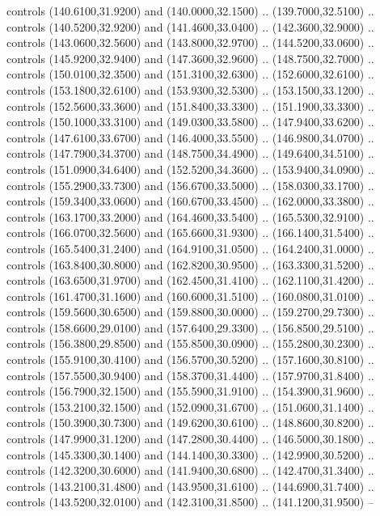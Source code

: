 {\begin{scope}[y=0.80pt, x=0.80pt, yscale=-1, xscale=1, inner sep=0pt, outer sep=0pt, #1]
      controls (140.6100,31.9200) and (140.0000,32.1500) .. (139.7000,32.5100) ..
      controls (140.5200,32.9200) and (141.4600,33.0400) .. (142.3600,32.9000) ..
      controls (143.0600,32.5600) and (143.8000,32.9700) .. (144.5200,33.0600) ..
      controls (145.9200,32.9400) and (147.3600,32.9600) .. (148.7500,32.7000) ..
      controls (150.0100,32.3500) and (151.3100,32.6300) .. (152.6000,32.6100) ..
      controls (153.1800,32.6100) and (153.9300,32.5300) .. (153.1500,33.1200) ..
      controls (152.5600,33.3600) and (151.8400,33.3300) .. (151.1900,33.3300) ..
      controls (150.1000,33.3100) and (149.0300,33.5800) .. (147.9400,33.6200) ..
      controls (147.6100,33.6700) and (146.4000,33.5500) .. (146.9800,34.0700) ..
      controls (147.7900,34.3700) and (148.7500,34.4900) .. (149.6400,34.5100) ..
      controls (151.0900,34.6400) and (152.5200,34.3600) .. (153.9400,34.0900) ..
      controls (155.2900,33.7300) and (156.6700,33.5000) .. (158.0300,33.1700) ..
      controls (159.3400,33.0600) and (160.6700,33.4500) .. (162.0000,33.3800) ..
      controls (163.1700,33.2000) and (164.4600,33.5400) .. (165.5300,32.9100) ..
      controls (166.0700,32.5600) and (165.6600,31.9300) .. (166.1400,31.5400) ..
      controls (165.5400,31.2400) and (164.9100,31.0500) .. (164.2400,31.0000) ..
      controls (163.8400,30.8000) and (162.8200,30.9500) .. (163.3300,31.5200) ..
      controls (163.6500,31.9700) and (162.4500,31.4100) .. (162.1100,31.4200) ..
      controls (161.4700,31.1600) and (160.6000,31.5100) .. (160.0800,31.0100) ..
      controls (159.5600,30.6500) and (159.8800,30.0000) .. (159.2700,29.7300) ..
      controls (158.6600,29.0100) and (157.6400,29.3300) .. (156.8500,29.5100) ..
      controls (156.3800,29.8500) and (155.8500,30.0900) .. (155.2800,30.2300) ..
      controls (155.9100,30.4100) and (156.5700,30.5200) .. (157.1600,30.8100) ..
      controls (157.5500,30.9400) and (158.3700,31.4400) .. (157.9700,31.8400) ..
      controls (156.7900,32.1500) and (155.5900,31.9100) .. (154.3900,31.9600) ..
      controls (153.2100,32.1500) and (152.0900,31.6700) .. (151.0600,31.1400) ..
      controls (150.3900,30.7300) and (149.6200,30.6100) .. (148.8600,30.8200) ..
      controls (147.9900,31.1200) and (147.2800,30.4400) .. (146.5000,30.1800) ..
      controls (145.3300,30.1400) and (144.1400,30.3300) .. (142.9900,30.5200) ..
      controls (142.3200,30.6000) and (141.9400,30.6800) .. (142.4700,31.3400) ..
      controls (143.2100,31.4800) and (143.9500,31.6100) .. (144.6900,31.7400) ..
      controls (143.5200,32.0100) and (142.3100,31.8500) .. (141.1200,31.9500) --

\end{scope}}

